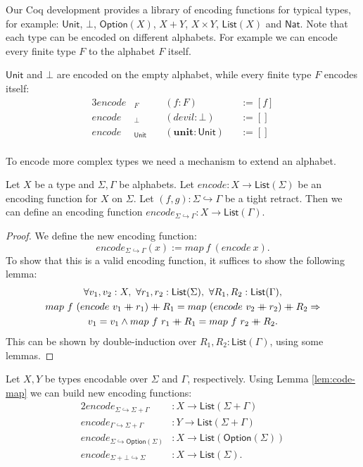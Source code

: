 \documentclass{psartcl}
\newcommand{\MS}[1]{\textsf{#1}}
\newcommand\mdoubleplus{\ensuremath{\mathbin{+\mkern-10mu+}}}
\newcommand{\app}{\mdoubleplus}
\newcommand{\from}{:}
\renewcommand{\to}{\rightarrow}
\newcommand{\Option}{\MS{Option}}
\newcommand{\Nat}{\MS{Nat}}
\newcommand{\Unit}{\MS{Unit}}
\newcommand{\List}{\MS{List}}
\newcommand{\unit}{\mathbf{unit}}
\newcommand{\Tau}{\Gamma}
\begin{document}
Our Coq development provides a library of encoding functions for typical types, for example:  $\Unit$, $\bot$, $\Option(X)$, $X+Y$, $X \times Y$, $\List(X)$
and $\Nat$.  Note that each type can be encoded on different alphabets.  For example we can encode every finite type $F$ to the alphabet $F$ itself.

\begin{example}
  \label{ex:bacic-code}
  $\Unit$ and $\bot$ are encoded on the empty alphabet, while every finite type $F$ encodes itself:
  \begin{alignat*}{3}
    encode&_F    &&~(f:F)         &&:= [f] \\
    encode&_\bot &&~(devil:\bot)  &&:= [] \\
    encode&_\Unit&&~(\unit:\Unit) &&:= [] \\
  \end{alignat*}
\end{example}

To encode more complex types we need a mechanism to extend an alphabet.
\begin{lemma}
  \label{lem:code-map}
  Let $X$ be a type and $\Sigma, \Tau$ be alphabets.
  Let $encode \from X \to \List(\Sigma)$ be an encoding function for $X$ on $\Sigma$.
  Let $(f,g) \from \Sigma \hookrightarrow \Tau$ be a tight retract.
  Then we can define an encoding function $encode_{\Sigma \hookrightarrow \Tau} \from X \to \List(\Tau)$.
\end{lemma}

\begin{proof}
  We define the new encoding function:
  $$encode_{\Sigma \hookrightarrow \Tau}(x) := map~f~(encode~x).$$
  To show that this is a valid encoding function, it suffices to show the following lemma:
  \begin{multline*}
    \forall v_1,v_2:X,~\forall r_1, r_2:\List(\Sigma),~\forall R_1, R_2:\List(\Tau),\\
    map~f~(encode~v_1 \app r_1) \app R_1 = map~(encode~v_2 \app r_2) \app R_2 \Rightarrow \\
    v_1 = v_1 \land map~f~r_1 \app R_1 = map~f~r_2 \app R_2.
  \end{multline*}
  This can be shown by double-induction over $R_1, R_2:\List(\Tau)$, using some lemmas.
\end{proof}


\begin{corollary}
  \label{lem:extend-alphabet}
  Let $X, Y$ be types encodable over $\Sigma$ and $\Tau$, respectively.
  Using Lemma \ref{lem:code-map} we can build new encoding functions:
  \begin{alignat*}{2}
    encode_{\Sigma \hookrightarrow \Sigma + \Tau} &\from X \to \List(\Sigma + \Tau) \\
    encode_{\Tau   \hookrightarrow \Sigma + \Tau} &\from Y \to \List(\Sigma + \Tau) \\
    encode_{\Sigma \hookrightarrow \Option(\Sigma)}  &\from X \to \List(\Option(\Sigma)) \\
    encode_{\Sigma + \bot \hookrightarrow \Sigma} &\from X \to \List(\Sigma).
  \end{alignat*}
\end{corollary}
\end{document}
